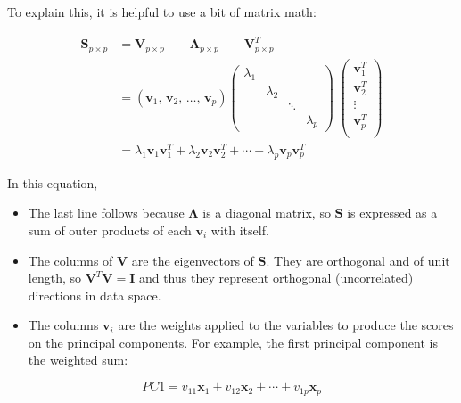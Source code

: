 \documentclass[
  letterpaper,
  10pt,
  krantz2]{krantz}
\begin{document}
To explain this, it is helpful to use a bit of matrix math:

\begin{align*}
\mathbf{S}_{p \times p} & = \mathbf{V}_{p \times p} \quad\quad \mathbf{\Lambda}_{p \times p} \quad\quad \mathbf{V}_{p \times p}^T \\
           & = \left( \mathbf{v}_1, \, \mathbf{v}_2, \,\dots, \, \mathbf{v}_p \right)
           \begin{pmatrix}
             \lambda_1 &  &  & \\ 
             & \lambda_2  &   & \\ 
             &  & \ddots & \\ 
             &  &  & \lambda_p 
            \end{pmatrix}
            \;
            \begin{pmatrix}
            \mathbf{v}_1^T\\ 
            \mathbf{v}_2^T\\ 
            \vdots\\ 
            \mathbf{v}_p^T\\ 
            \end{pmatrix}
           \\
           & = \lambda_1 \mathbf{v}_1 \mathbf{v}_1^T + \lambda_2 \mathbf{v}_2 \mathbf{v}_2^T + \cdots + \lambda_p \mathbf{v}_p \mathbf{v}_p^T
\end{align*}

In this equation,

\begin{itemize}
\item
  The last line follows because \(\mathbf{\Lambda}\) is a diagonal
  matrix, so \(\mathbf{S}\) is expressed as a sum of outer products of
  each \(\mathbf{v}_i\) with itself.\\
\item
  The columns of \(\mathbf{V}\) are the eigenvectors of \(\mathbf{S}\).
  They are orthogonal and of unit length, so
  \(\mathbf{V}^T \mathbf{V} = \mathbf{I}\) and thus they represent
  orthogonal (uncorrelated) directions in data space.
\item
  The columns \(\mathbf{v}_i\) are the weights applied to the variables
  to produce the scores on the principal components. For example, the
  first principal component is the weighted sum:
\end{itemize}

\[
PC1 = v_{11} \mathbf{x}_1 + v_{12} \mathbf{x}_2 + \cdots + v_{1p} \mathbf{x}_p
\]
\end{document}
